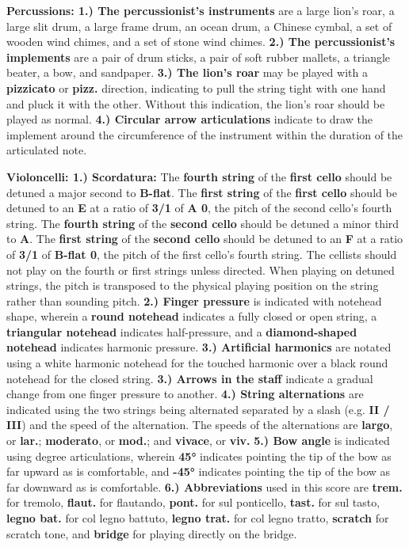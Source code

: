 \documentclass[12pt]{article}
\begin{document}
\begingroup
\textbf{Percussions: 1.) The percussionist's instruments} are a large lion's roar, a large slit drum, a large frame drum, an ocean drum, a Chinese cymbal, a set of wooden wind chimes, and a set of stone wind chimes. \textbf{2.) The percussionist's implements} are a pair of drum sticks, a pair of soft rubber mallets, a triangle beater, a bow, and sandpaper. \textbf{3.) The lion's roar} may be played with a \textbf{pizzicato} or \textbf{pizz.} direction, indicating to pull the string tight with one hand and pluck it with the other. Without this indication, the lion's roar should be played as normal. \textbf{4.) Circular arrow articulations} indicate to draw the implement around the circumference of the instrument within the duration of the articulated note. 
\endgroup

\pagebreak

\begingroup
\textbf{Violoncelli: 1.) Scordatura:} The \textbf{fourth string} of the \textbf{first cello} should be detuned a major second to \textbf{B-flat}. The \textbf{first string} of the \textbf{first cello} should be detuned to an \textbf{E} at a ratio of \textbf{3/1} of \textbf{A 0}, the pitch of the second cello's fourth string. The \textbf{fourth string} of the \textbf{second cello} should be detuned a minor third to \textbf{A}. The \textbf{first string} of the \textbf{second cello} should be detuned to an \textbf{F} at a ratio of \textbf{3/1} of \textbf{B-flat 0}, the pitch of the first cello's fourth string. The cellists should not play on the fourth or first strings unless directed. When playing on detuned strings, the pitch is transposed to the physical playing position on the string rather than sounding pitch. \textbf{2.) Finger pressure} is indicated with notehead shape, wherein a \textbf{round notehead} indicates a fully closed or open string, a \textbf{triangular notehead} indicates half-pressure, and a \textbf{diamond-shaped notehead} indicates harmonic pressure. \textbf{3.) Artificial harmonics} are notated using a white harmonic notehead for the touched harmonic over a black round notehead for the closed string. \textbf{3.) Arrows in the staff} indicate a gradual change from one finger pressure to another. \textbf{4.) String alternations} are indicated using the two strings being alternated separated by a slash (e.g. \textbf{II / III}) and the speed of the alternation. The speeds of the alternations are \textbf{largo}, or \textbf{lar.}; \textbf{moderato}, or \textbf{mod.}; and \textbf{vivace}, or \textbf{viv.} \textbf{5.) Bow angle} is indicated using degree articulations, wherein \textbf{45°} indicates pointing the tip of the bow as far upward as is comfortable, and \textbf{-45°} indicates pointing the tip of the bow as far downward as is comfortable. \textbf{6.) Abbreviations} used in this score are \textbf{trem.} for tremolo, \textbf{flaut.} for flautando, \textbf{pont.} for sul ponticello, \textbf{tast.} for sul tasto,  \textbf{legno bat.} for col legno battuto, \textbf{legno trat.} for col legno tratto, \textbf{scratch} for scratch tone, and \textbf{bridge} for playing directly on the bridge. 
\endgroup
\end{document}
